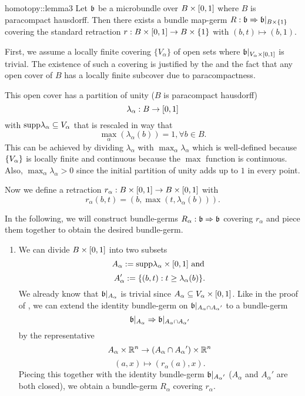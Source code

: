 \begin{scope}
    \newcommand{\A} {
        A_\alpha{}
    }

    \begin{mylemma}{homotopy::lemma3}{}
        Let $\mathfrak{b}$ be a microbundle over $B \times{} [0, 1]$ where $B$ is paracompact hausdorff.
        Then there exists a bundle map-germ $R: \mathfrak{b} \Rightarrow{} \mathfrak{b}\vert_{B \times{} \{1\}}$
        covering the standard retraction $r: B \times{} [0, 1] \to B \times{} \{1\}$ with $(b, t) \mapsto (b, 1)$.
    \end{mylemma}

    \begin{myproof}
        First, we assume a locally finite covering $\{V_\alpha\}$ of open sets
        where $\mathfrak{b}\vert_{V_\alpha \times{} [0, 1]}$ is trivial.
        The existence of such a covering is justified by the  and
        the fact that any open cover of $B$ has a locally finite subcover due to paracompactness.

        This open cover has a partition of unity ($B$ is paracompact hausdorff) 
        \[ \lambda_\alpha: B \to [0, 1] \]
        with $\text{supp} \lambda_\alpha \subseteq{} V_\alpha$ that is rescaled in way that
        \[ \max_\alpha(\lambda_\alpha(b)) = 1, \forall b \in B. \]
        This can be achieved by dividing $\lambda_\alpha$ with $\max_\alpha \lambda_\alpha$
        which is well-defined because $\{V_\alpha\}$ is locally finite and continuous
        because the $\max$ function is continuous.
        Also, $\max_\alpha \lambda_\alpha > 0$ since the initial
        partition of unity adds up to $1$ in every point.

        Now we define a retraction $r_\alpha: B \times{} [0, 1] \to B \times{} [0, 1]$ with
        \[ r_\alpha(b, t) = (b, \max(t, \lambda_\alpha(b))). \]

        In the following,
        we will construct bundle-germs $R_\alpha: \mathfrak{b} \Rightarrow{} \mathfrak{b}$ covering $r_\alpha$
        and piece them together to obtain the desired bundle-germ.
        \begin{enumerate}
            \item 
            We can divide $B \times [0, 1]$ into two subsets
            \[ A_\alpha := \text{supp}{\lambda_\alpha} \times{} [0, 1] \text{ and } \]
            \[ A'_\alpha := \{(b, t):t \ge \lambda_\alpha(b)\}. \]
            We already know that $\mathfrak{b}\vert_{A_\alpha}$
            is trivial since $A_\alpha \subseteq{} V_\alpha \times{} [0, 1]$.
            Like in the proof of ,
            we can extend the identity bundle-germ on $\bb\restr{\A \cap \A'}$ to a bundle-germ
            \[ \germ{\bb\restr{\A}}{\bb\restr{\A \cap \A'}} \]
            by the representative
            \[ \A \times \R^n \to (\A \cap \A') \times \R^n\]
            \[ (a, x) \mapsto (r_\alpha(a), x). \]
            Piecing this together with the identity
            bundle-germ $\bb\restr{\A'}$ ($\A$ and $\A'$ are both closed),
            we obtain a bundle-germ $R_\alpha$ covering $r_\alpha$.
            

\end{enumerate}
\end{myproof}
\end{scope}
